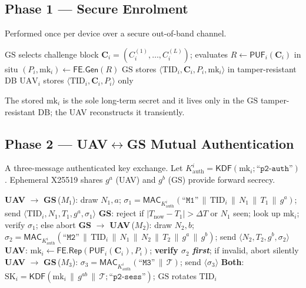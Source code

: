 \documentclass[11pt]{article}
\theoremstyle{plain}
\theoremstyle{definition}
\newcommand{\GS}{\mathrm{GS}}
\newcommand{\UAV}{\mathrm{UAV}}
\newcommand{\PUF}{\mathsf{PUF}}
\newcommand{\TID}{\mathrm{TID}}
\newcommand{\mk}{\mathrm{mk}}
\newcommand{\SK}{\mathrm{SK}}
\newcommand{\MAC}{\mathsf{MAC}}
\newcommand{\KDF}{\mathsf{KDF}}
\newcommand{\Gen}{\mathsf{Gen}}
\newcommand{\Rep}{\mathsf{Rep}}
\newcommand{\FE}{\mathsf{FE}}
\newcommand{\lbl}[1]{\text{``}\texttt{#1}\text{''}}
\newcommand{\catt}{\,\|\,}          %
\newcommand{\transcript}{\mathcal{T}}
\begin{document}
\subsection{Phase 1 --- Secure Enrolment}
\label{sec:p1}
Performed once per device over a secure out-of-band channel.

\begin{algorithm}[h]
\caption{Phase 1: Enrolment of $\UAV_i$}
\label{alg:p1}
\begin{algorithmic}[1]
\State $\GS$ selects challenge block $\bm{C}_i=(C_i^{(1)},\dots,C_i^{(L)})$;
       evaluates $R \gets \PUF_i(\bm{C}_i)$ in situ
\State $(P_i,\mk_i)\gets \FE.\Gen(R)$
\State $\GS$ stores $\langle \TID_i,\bm{C}_i,P_i,\mk_i\rangle$ in
       tamper-resistant DB
\State $\UAV_i$ stores $\langle \TID_i,\bm{C}_i,P_i\rangle$ only
\end{algorithmic}
\end{algorithm}

\noindent The stored $\mk_i$ is the sole long-term secret and it lives only
in the $\GS$ tamper-resistant DB; the UAV reconstructs it transiently.

\subsection{Phase 2 --- UAV$\leftrightarrow$GS Mutual Authentication}
\label{sec:p2}
A three-message authenticated key exchange. Let
$K^{i}_{\mathrm{auth}}=\KDF(\mk_i;\lbl{p2-auth})$. Ephemeral X25519 shares
$g^{a}$ (UAV) and $g^{b}$ (GS) provide forward secrecy.

\begin{algorithm}[h]
\caption{Phase 2: Mutual authentication and forward-secret keying}
\label{alg:p2}
\begin{algorithmic}[1]
\State \textbf{UAV} $\to$ \textbf{GS}\,($M_1$): draw $N_1,a$;\;
  $\sigma_1=\MAC_{K^{i}_{\mathrm{auth}}}(\lbl{M1}\catt \TID_i\catt N_1\catt
  T_1\catt g^{a})$;\; send $\langle \TID_i,N_1,T_1,g^{a},\sigma_1\rangle$
\State \textbf{GS}: reject if $|T_{\text{now}}-T_1|>\Delta T$ or $N_1$ seen;
  look up $\mk_i$; verify $\sigma_1$; else abort
\State \textbf{GS} $\to$ \textbf{UAV}\,($M_2$): draw $N_2,b$;\;
  $\sigma_2=\MAC_{K^{i}_{\mathrm{auth}}}(\lbl{M2}\catt \TID_i\catt N_1\catt
  N_2\catt T_2\catt g^{a}\catt g^{b})$;\;
  send $\langle N_2,T_2,g^{b},\sigma_2\rangle$
\State \textbf{UAV}: $\mk_i\gets \FE.\Rep(\PUF_i(\bm{C}_i),P_i)$;
  \textbf{verify $\sigma_2$ \emph{first}}; if invalid, abort silently
\State \textbf{UAV} $\to$ \textbf{GS}\,($M_3$):
  $\sigma_3=\MAC_{K^{i}_{\mathrm{auth}}}(\lbl{M3}\catt\transcript)$;\;
  send $\langle\sigma_3\rangle$ \Comment{$\transcript=$ all $M_1,M_2$ fields}
\State \textbf{Both}: $\SK_i=\KDF(\mk_i\catt g^{ab}\catt\transcript;
  \lbl{p2-sess})$; $\GS$ rotates $\TID_i$
\end{algorithmic}
\end{algorithm}
\end{document}
